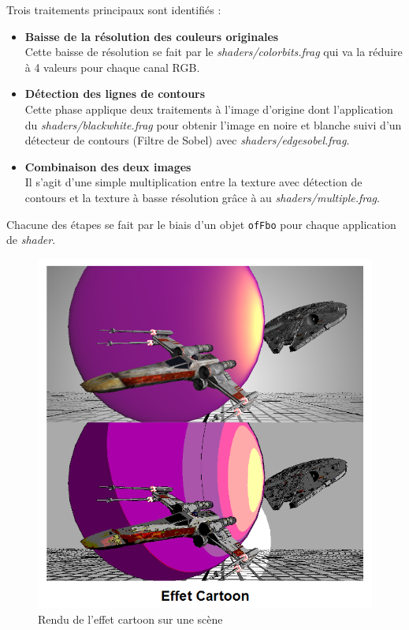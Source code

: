 Trois traitements principaux sont identifiés :
\begin{itemize}
\item \textbf{Baisse de la résolution des couleurs originales}\\
Cette baisse de résolution se fait par le \textit{shaders/colorbits.frag} qui va la réduire à 4 valeurs pour chaque canal RGB.
\item \textbf{Détection des lignes de contours}\\
Cette phase applique deux traitements à l'image d'origine dont l'application du \textit{shaders/blackwhite.frag} pour obtenir l'image en noire et blanche suivi d'un détecteur de contours (Filtre de Sobel) avec \textit{shaders/edgesobel.frag}.
\item \textbf{Combinaison des deux images}\\
Il s'agit d'une simple multiplication entre la texture avec détection de contours et la texture à basse résolution grâce à au \textit{shaders/multiple.frag}. \\
\end{itemize}

Chacune des étapes se fait par le biais d'un objet \texttt{ofFbo} pour chaque application de \textit{shader}.


\begin{figure}[H]
    \centering
	\includegraphics[scale=1]{img/infog-image-effet-cartoon.png}
	\caption{Rendu de l'effet cartoon sur une scène}
	\label{fig:cartooneffect}
\end{figure}
\clearpage

